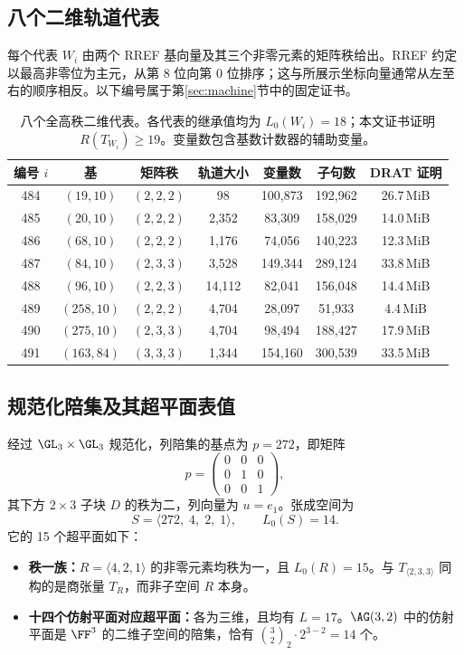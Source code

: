 \documentclass[11pt,a4paper]{article}
\begin{document}
\subsection{八个二维轨道代表}

每个代表 $W_i$ 由两个 RREF 基向量及其三个非零元素的矩阵秩给出。RREF 约定以最高非零位为主元，从第 8 位向第 0 位排序；这与所展示坐标向量通常从左至右的顺序相反。以下编号属于第\ref{sec:machine}节中的固定证书。

\begin{table}[H]
\centering
\caption{八个全高秩二维代表。各代表的继承值均为 $L_0(W_i)=18$；本文证书证明 $R(T_{W_i})\ge19$。变量数包含基数计数器的辅助变量。}
\label{tab:dim2}
\begin{tabular}{ccccccc}
\toprule
编号 $i$&基&矩阵秩&轨道大小&变量数&子句数&DRAT 证明\\
\midrule
484 & $(19,10)$  & $(2,2,2)$ &    98 & 100{,}873 & 192{,}962 & 26.7\,MiB \\
485 & $(20,10)$  & $(2,2,2)$ & 2{,}352 &  83{,}309 & 158{,}029 & 14.0\,MiB \\
486 & $(68,10)$  & $(2,2,2)$ & 1{,}176 &  74{,}056 & 140{,}223 & 12.3\,MiB \\
487 & $(84,10)$  & $(2,3,3)$ & 3{,}528 & 149{,}344 & 289{,}124 & 33.8\,MiB \\
488 & $(96,10)$  & $(2,2,3)$ & 14{,}112 &  82{,}041 & 156{,}048 & 14.4\,MiB \\
489 & $(258,10)$ & $(2,2,2)$ & 4{,}704 &  28{,}097 &  51{,}933 &  4.4\,MiB \\
490 & $(275,10)$ & $(2,3,3)$ & 4{,}704 &  98{,}494 & 188{,}427 & 17.9\,MiB \\
491 & $(163,84)$ & $(3,3,3)$ & 1{,}344 & 154{,}160 & 300{,}539 & 33.5\,MiB \\
\bottomrule
\end{tabular}
\end{table}

\subsection{规范化陪集及其超平面表值}

经过 $\GL_3\times\GL_3$ 规范化，列陪集的基点为 $p=272$，即矩阵
\[
  p=\begin{pmatrix}0&0&0\\0&1&0\\0&0&1\end{pmatrix},
\]
其下方 $2\times3$ 子块 $D$ 的秩为二，列向量为 $u=e_1$。张成空间为
\[
  S=\langle272,\;4,\;2,\;1\rangle,\qquad L_0(S)=14.
\]
它的 15 个超平面如下：
\begin{itemize}
  \item \textbf{秩一族：}$R=\langle4,2,1\rangle$ 的非零元素均秩为一，且 $L_0(R)=15$。与 $T_{\langle2,3,3\rangle}$ 同构的是商张量 $T_R$，而非子空间 $R$ 本身。
  \item \textbf{十四个仿射平面对应超平面：}各为三维，且均有 $L=17$。$\AG(3,2)$ 中的仿射平面是 $\FF^3$ 的二维子空间的陪集，恰有 $\binom{3}{2}_2\cdot2^{3-2}=14$ 个。
\end{itemize}
\end{document}
